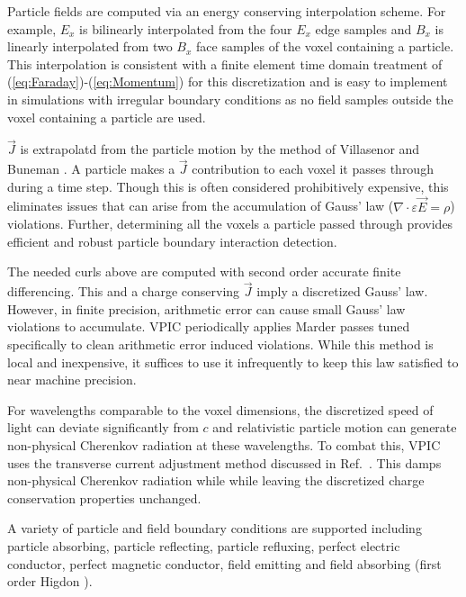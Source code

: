\documentclass[10pt]{article}
\newcommand{\eps}{\varepsilon}
\newcommand{\vecJ}{\vec{J}}
\newcommand{\vecE}{\vec{E}}
\newcommand{\Div}[1]{\nabla \cdot #1}
\newcommand{\eq}[1]{(\ref{eq:#1})}
\begin{document}
Particle fields are computed via an energy conserving interpolation
scheme.  For example, $E_x$ is bilinearly interpolated from the four
$E_x$ edge samples and $B_x$ is linearly interpolated from two $B_x$
face samples of the voxel containing a particle.  This interpolation
is consistent with a finite element time domain treatment of
\eq{Faraday}-\eq{Momentum} for this discretization
\cite{Eastwood_et_al_1995} and is easy to implement in simulations
with irregular boundary conditions as no field samples outside the
voxel containing a particle are used.

$\vecJ$ is extrapolatd from the particle motion by the method of
Villasenor and Buneman \cite{Villasenor_Buneman_1992}.  A particle
makes a $\vecJ$ contribution to each voxel it passes through during a
time step.  Though this is often considered prohibitively expensive,
this eliminates issues that can arise from the accumulation of Gauss'
law ($\Div{\eps\vecE}=\rho$) violations.  Further, determining all the
voxels a particle passed through provides efficient and robust
particle boundary interaction detection.

The needed curls above are computed with second order accurate finite
differencing.  This and a charge conserving $\vecJ$ imply a
discretized Gauss' law.  However, in finite precision, arithmetic
error can cause small Gauss' law violations to accumulate.  VPIC
periodically applies Marder passes \cite{Marder_1987} tuned
specifically to clean arithmetic error induced violations.  While this
method is local and inexpensive, it suffices to use it infrequently to
keep this law satisfied to near machine precision.

For wavelengths comparable to the voxel dimensions, the discretized
speed of light can deviate significantly from $c$ and relativistic
particle motion can generate non-physical Cherenkov radiation at these
wavelengths.  To combat this, VPIC uses the transverse current
adjustment method discussed in Ref.~\cite{Eastwood_et_al_1995}.  This
damps non-physical Cherenkov radiation while while leaving the
discretized charge conservation properties unchanged.

A variety of particle and field boundary conditions are supported
including particle absorbing, particle reflecting, particle refluxing,
perfect electric conductor, perfect magnetic conductor, field emitting
and field absorbing (first order Higdon \cite{Higdon_1986}).
\end{document}
